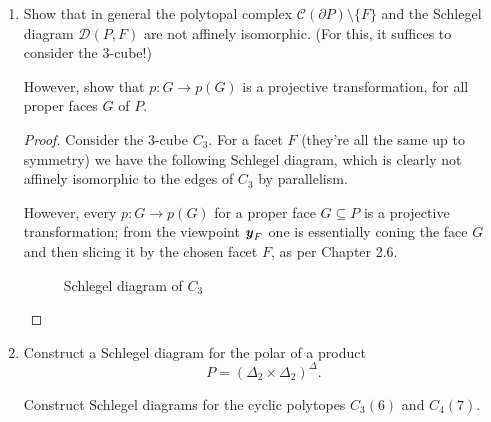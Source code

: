 \documentclass{article}
\begin{document}
\begin{enumerate}
\begin{solution}
    Note that although every Schlegel diagram is regular, this counterexample disproves the converse, in general. Furthermore, it is the case that every 2-diagram is \textit{combinatorially equivalent} to a Schlegel diagram, as per Theorem 5.8.
\end{solution}

\item Show that in general the polytopal complex $\mathcal C(\partial P)\setminus\{F\}$ and the Schlegel diagram $\mathcal D(P,F)$ are not affinely isomorphic. (For this, it suffices to consider the $3$-cube!) 

However, show that $p: G\to p(G)$ is a projective transformation, for all proper faces $G$ of $P$.

\begin{proof}
    Consider the 3-cube $C_3$. For a facet $F$ (they're all the same up to symmetry) we have the following Schlegel diagram, which is clearly not affinely isomorphic to the edges of $C_3$ by parallelism.

    However, every $p: G \to p(G)$ for a proper face $G \subseteq P$ is a projective transformation; from the viewpoint $\textbf{\textit{y}}_F$ one is essentially coning the face $G$ and then slicing it by the chosen facet $F$, as per Chapter 2.6.
\begin{figure}[h]
    \centering
{}

\caption{Schlegel diagram of $C_3$}
\end{figure}
\end{proof}

\item Construct a Schlegel diagram for the polar of a product
\[P=(\Delta_2 \times \Delta_2)^{\Delta}.\]

Construct Schlegel diagrams for the cyclic polytopes $C_3(6)$ and $C_4(7)$.


\end{enumerate}
\end{document}
